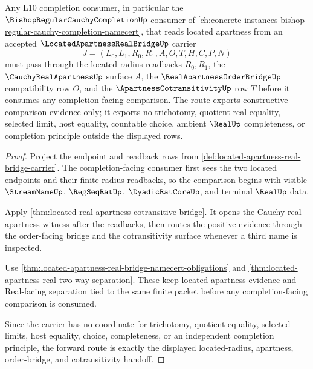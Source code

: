 \begin{theorem}
\label{thm:located-apartness-real-bridge-completion-forward-route}
Any L10 completion consumer, in particular the $\BishopRegularCauchyCompletionUp$ consumer of \autoref{ch:concrete-instances-bishop-regular-cauchy-completion-namecert}, that reads located apartness from an accepted $\LocatedApartnessRealBridgeUp$ carrier
$$
J=(L_0,L_1,R_0,R_1,A,O,T,H,C,P,N)
$$
must pass through the located-radius readbacks $R_0,R_1$, the $\CauchyRealApartnessUp$ surface $A$, the $\RealApartnessOrderBridgeUp$ compatibility row $O$, and the $\ApartnessCotransitivityUp$ row $T$ before it consumes any completion-facing comparison. The route exports constructive comparison evidence only; it exports no trichotomy, quotient-real equality, selected limit, host equality, countable choice, ambient $\RealUp$ completeness, or completion principle outside the displayed rows.
\end{theorem}
\begin{proof}
Project the endpoint and readback rows from \autoref{def:located-apartness-real-bridge-carrier}. The completion-facing consumer first sees the two located endpoints and their finite radius readbacks, so the comparison begins with visible $\StreamNameUp$, $\RegSeqRatUp$, $\DyadicRatCoreUp$, and terminal $\RealUp$ data.

Apply \autoref{thm:located-real-apartness-cotransitive-bridge}. It opens the Cauchy real apartness witness after the readbacks, then routes the positive evidence through the order-facing bridge and the cotransitivity surface whenever a third name is inspected.

Use \autoref{thm:located-apartness-real-bridge-namecert-obligations} and \autoref{thm:located-apartness-real-two-way-separation}. These keep located-apartness evidence and Real-facing separation tied to the same finite packet before any completion-facing comparison is consumed.

Since the carrier has no coordinate for trichotomy, quotient equality, selected limits, host equality, choice, completeness, or an independent completion principle, the forward route is exactly the displayed located-radius, apartness, order-bridge, and cotransitivity handoff.
\end{proof}


